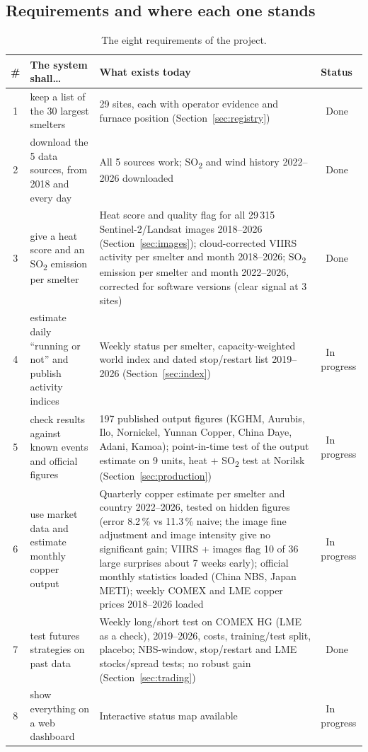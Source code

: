 \documentclass[10pt,a4paper]{article}
\newcommand{\SOtwo}{SO\textsubscript{2}}
\newcommand{\done}{\textcolor{done}{\ding{51}~Done}}
\newcommand{\wip}{\textcolor{wip}{\ding{108}~In progress}}
\begin{document}
\subsection{Requirements and where each one stands}
\begin{table}[H]
\centering\small
\begin{tabularx}{\textwidth}{@{}c >{\raggedright\arraybackslash}p{2.7cm} X l@{}}
\toprule
\textbf{\#} & \textbf{The system shall\ldots} & \textbf{What exists today} & \textbf{Status}\\
\midrule
1 & keep a list of the 30 largest smelters & 29 sites, each with operator evidence and furnace position (Section~\ref{sec:registry}) & \done\\
2 & download the 5 data sources, from 2018 and every day & All 5 sources work; \SOtwo{} and wind history 2022--2026 downloaded & \done\\
3 & give a heat score and an \SOtwo{} emission per smelter & Heat score and quality flag for all 29\,315 Sentinel-2/Landsat images 2018--2026 (Section~\ref{sec:images}); cloud-corrected VIIRS activity per smelter and month 2018--2026; \SOtwo{} emission per smelter and month 2022--2026, corrected for software versions (clear signal at 3 sites) & \done\\
4 & estimate daily ``running or not'' and publish activity indices & Weekly status per smelter, capacity-weighted world index and dated stop/restart list 2019--2026 (Section~\ref{sec:index}) & \wip\\
5 & check results against known events and official figures & 197 published output figures (KGHM, Aurubis, Ilo, Nornickel, Yunnan Copper, China Daye, Adani, Kamoa); point-in-time test of the output estimate on 9 units, heat + \SOtwo{} test at Norilsk (Section~\ref{sec:production}) & \wip\\
6 & use market data and estimate monthly copper output & Quarterly copper estimate per smelter and country 2022--2026, tested on hidden figures (error 8.2\,\% vs 11.3\,\% naive; the image fine adjustment and image intensity give no significant gain; VIIRS + images flag 10 of 36 large surprises about 7 weeks early); official monthly statistics loaded (China NBS, Japan METI); weekly COMEX and LME copper prices 2018--2026 loaded & \wip\\
7 & test futures strategies on past data & Weekly long/short test on COMEX HG (LME as a check), 2019--2026, costs, training/test split, placebo; NBS-window, stop/restart and LME stocks/spread tests; no robust gain (Section~\ref{sec:trading}) & \done\\
8 & show everything on a web dashboard & Interactive status map available & \wip\\
\bottomrule
\end{tabularx}
\caption{The eight requirements of the project.}
\end{table}
\end{document}
